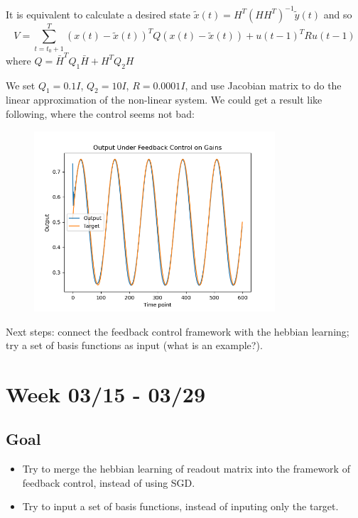 \documentclass[12pt, a4paper]{article}
\begin{document}
It is equivalent to calculate a desired state $\tilde{x}(t) = H^T(HH^{T})^{-1}\tilde{y}(t)$ and so $$V = \sum_{t=t_0+1}^T (x(t) - \tilde{x}(t))^T Q (x(t)- \tilde{x}(t)) + u(t-1)^T R u(t-1)$$ where $Q=\bar{H}^T Q_1 \bar{H} + H^T Q_2 H$

We set $Q_1 = 0.1I$, $Q_2 = 10I$, $R=0.0001I$, and use Jacobian matrix to do the linear approximation of the non-linear system. We could get a result like following, where the control seems not bad:

\begin{figure}[H]
    \centering
    \includegraphics[width=0.8\textwidth]{RNN/FORCE/fig/FORCE_tracking_output_0412.png} \\
\end{figure}

Next steps: connect the feedback control framework with the hebbian learning; try a set of basis functions as input (what is an example?).

\newpage

\section*{Week 03/15 - 03/29}

\subsection*{Goal}

\noindent
\begin{itemize}
    \item Try to merge the hebbian learning of readout matrix into the framework of feedback control, instead of using SGD.
    \item Try to input a set of basis functions, instead of inputing only the target.

\end{itemize}
\end{document}
